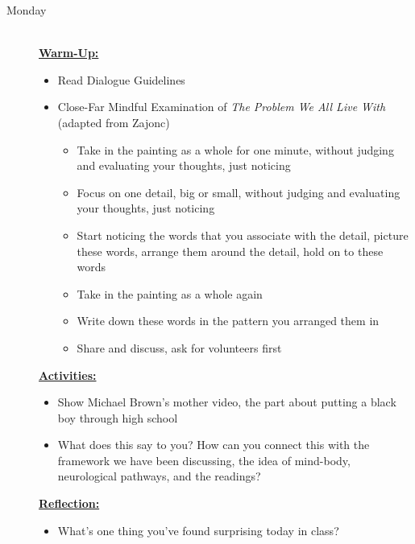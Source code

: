 \documentclass{article}
\newcommand{\listmon}{\item[\large\textsf{Monday}\normalsize] \hfill \\}
\newenvironment{daywu}
	{\underline{\textbf{Warm-Up:}} \hfill \\
	\begin{itemize}}
	{\end{itemize}}
\newenvironment{dayact}
	{\underline{\textbf{Activities:}} \hfill \\
	\begin{itemize}}
	{\end{itemize}}
\newenvironment{dayref}
	{\underline{\textbf{Reflection:}} \hfill \\
	\begin{itemize}}
	{\end{itemize}}
\newenvironment{weeksched}
	{\noindent
	\begin{description}}
	{\end{description}
	\newpage}
\begin{document}
\begin{weeksched}

\listmon
\begin{daywu}
	\item Read Dialogue Guidelines
	\item Close-Far Mindful Examination of \textit{The Problem We All Live With} (adapted from Zajonc)
	\begin{itemize}
		\item Take in the painting as a whole for one minute, without judging and evaluating your thoughts, just noticing
		\item Focus on one detail, big or small, without judging and evaluating your thoughts, just noticing
		\item Start noticing the words that you associate with the detail, picture these words, arrange them around the detail, hold on to these words
		\item Take in the painting as a whole again
		\item Write down these words in the pattern you arranged them in
		\item Share and discuss, ask for volunteers first
	\end{itemize}
\end{daywu}
\begin{dayact}
	\item Show Michael Brown's mother video, the part about putting a black boy through high school
	\item What does this say to you? How can you connect this with the framework we have been discussing, the idea of mind-body, neurological pathways, and the readings?
\end{dayact}
\begin{dayref}
	\item What's one thing you've found surprising today in class?
\end{dayref}


\end{weeksched}
\end{document}
